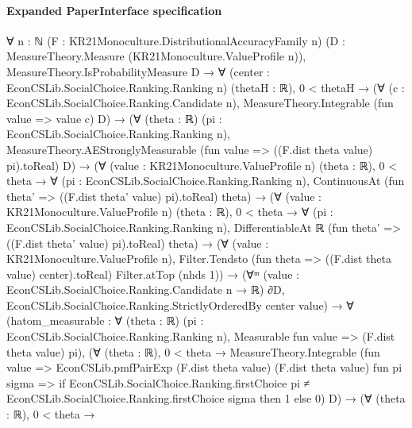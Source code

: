 \documentclass[10pt]{article}
\begin{document}
\paragraph{Expanded PaperInterface specification}
\begin{ReviewVerbatim}
∀ {n : ℕ} (F : KR21Monoculture.DistributionalAccuracyFamily n)
  (D : MeasureTheory.Measure (KR21Monoculture.ValueProfile n)),
  MeasureTheory.IsProbabilityMeasure D →
    ∀ (center : EconCSLib.SocialChoice.Ranking.Ranking n) (thetaH : ℝ),
      0 < thetaH →
        (∀ (c : EconCSLib.SocialChoice.Ranking.Candidate n), MeasureTheory.Integrable (fun value => value c) D) →
          (∀ (theta : ℝ) (pi : EconCSLib.SocialChoice.Ranking.Ranking n),
              MeasureTheory.AEStronglyMeasurable (fun value => ((F.dist theta value) pi).toReal) D) →
            (∀ (value : KR21Monoculture.ValueProfile n) (theta : ℝ),
                0 < theta →
                  ∀ (pi : EconCSLib.SocialChoice.Ranking.Ranking n),
                    ContinuousAt (fun theta' => ((F.dist theta' value) pi).toReal) theta) →
              (∀ (value : KR21Monoculture.ValueProfile n) (theta : ℝ),
                  0 < theta →
                    ∀ (pi : EconCSLib.SocialChoice.Ranking.Ranking n),
                      DifferentiableAt ℝ (fun theta' => ((F.dist theta' value) pi).toReal) theta) →
                (∀ (value : KR21Monoculture.ValueProfile n),
                    Filter.Tendsto (fun theta => ((F.dist theta value) center).toReal) Filter.atTop (nhds 1)) →
                  (∀ᵐ (value : EconCSLib.SocialChoice.Ranking.Candidate n → ℝ) ∂D,
                      EconCSLib.SocialChoice.Ranking.StrictlyOrderedBy center value) →
                    ∀
                      (hatom_measurable :
                        ∀ (theta : ℝ) (pi : EconCSLib.SocialChoice.Ranking.Ranking n),
                          Measurable fun value => (F.dist theta value) pi),
                      (∀ (theta : ℝ),
                          0 < theta →
                            MeasureTheory.Integrable
                              (fun value =>
                                EconCSLib.pmfPairExp (F.dist theta value) (F.dist theta value) fun pi sigma =>
                                  if
                                      EconCSLib.SocialChoice.Ranking.firstChoice pi ≠
                                        EconCSLib.SocialChoice.Ranking.firstChoice sigma then
                                    1
                                  else 0)
                              D) →
                        (∀ (theta : ℝ),
                            0 < theta →

\end{ReviewVerbatim}
\end{document}
